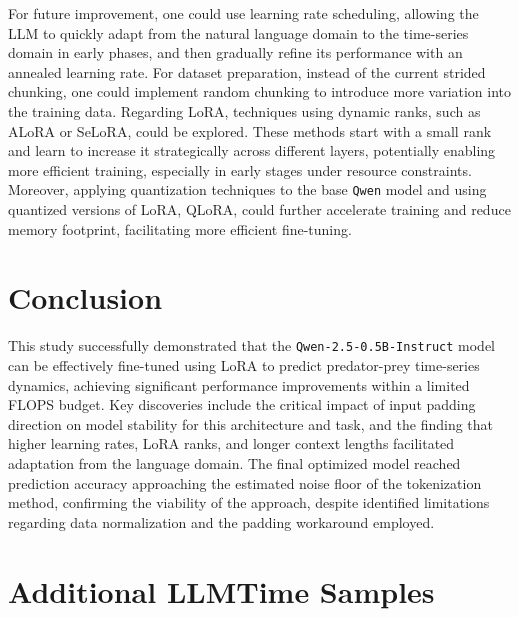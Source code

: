 \documentclass{article}
\begin{document}
For future improvement, one could use learning rate scheduling, allowing the LLM to quickly adapt from the natural language domain to the time-series domain in early phases, and then gradually refine its performance with an annealed learning rate. For dataset preparation, instead of the current strided chunking, one could implement random chunking to introduce more variation into the training data. Regarding LoRA, techniques using dynamic ranks, such as ALoRA or SeLoRA, could be explored. These methods start with a small rank and learn to increase it strategically across different layers, potentially enabling more efficient training, especially in early stages under resource constraints. Moreover, applying quantization techniques to the base \texttt{Qwen} model and using quantized versions of LoRA, QLoRA, could further accelerate training and reduce memory footprint, facilitating more efficient fine-tuning.






\section{Conclusion}
This study successfully demonstrated that the \texttt{Qwen-2.5-0.5B-Instruct} model can be effectively fine-tuned using LoRA to predict predator-prey time-series dynamics, achieving significant performance improvements within a limited FLOPS budget. Key discoveries include the critical impact of input padding direction on model stability for this architecture and task, and the finding that higher learning rates, LoRA ranks, and longer context lengths facilitated adaptation from the language domain. The final optimized model reached prediction accuracy approaching the estimated noise floor of the tokenization method, confirming the viability of the approach, despite identified limitations regarding data normalization and the padding workaround employed.








\appendix





\section{Additional LLMTime Samples}
\end{document}
